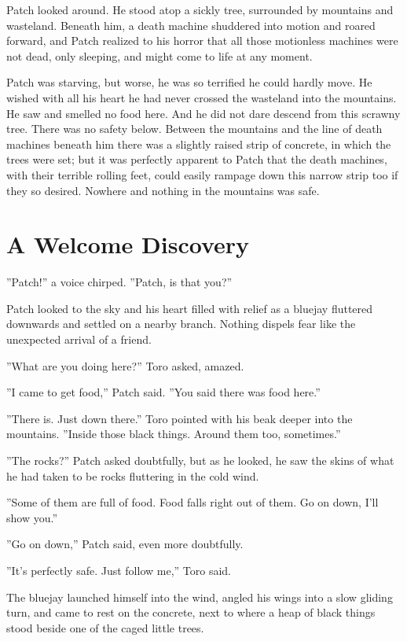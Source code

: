 \documentclass[12pt]{book}
\begin{document}
Patch looked around. He stood atop a sickly tree, surrounded by
mountains and wasteland. Beneath him, a death machine shuddered into
motion and roared forward, and Patch realized to his horror that all
those motionless machines were not dead, only sleeping, and might come
to life at any moment.

Patch was starving, but worse, he was so terrified he could hardly
move. He wished with all his heart he had never crossed the wasteland
into the mountains. He saw and smelled no food here. And he did not
dare descend from this scrawny tree. There was no safety
below. Between the mountains and the line of death machines beneath
him there was a slightly raised strip of concrete, in which the trees
were set; but it was perfectly apparent to Patch that the death
machines, with their terrible rolling feet, could easily rampage down
this narrow strip too if they so desired. Nowhere and nothing in the
mountains was safe.


\section{A Welcome Discovery}

''Patch!'' a voice chirped. ''Patch, is that you?''

Patch looked to the sky and his heart filled with relief as a bluejay
fluttered downwards and settled on a nearby branch. Nothing dispels
fear like the unexpected arrival of a friend.

''What are you doing here?'' Toro asked, amazed.

''I came to get food,'' Patch said. ''You said there was food here.''

''There is. Just down there.'' Toro pointed with his beak deeper into
the mountains. ''Inside those black things. Around them too,
sometimes.''

''The rocks?'' Patch asked doubtfully, but as he looked, he saw the
skins of what he had taken to be rocks fluttering in the cold wind.

''Some of them are full of food. Food falls right out of them. Go on
down, I'll show you.''

''Go on down,'' Patch said, even more doubtfully.

''It's perfectly safe. Just follow me,'' Toro said.

The bluejay launched himself into the wind, angled his wings into a
slow gliding turn, and came to rest on the concrete, next to where a
heap of black things stood beside one of the caged little trees.
\end{document}
